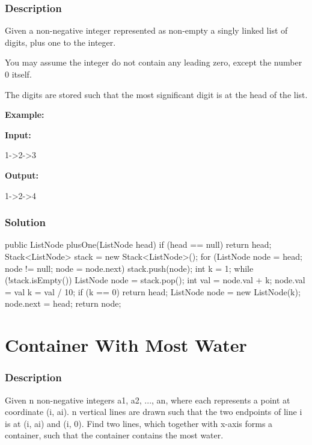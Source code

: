 \subsubsection{Description}
Given a non-negative integer represented as non-empty a singly linked list of digits, plus one to the integer.

You may assume the integer do not contain any leading zero, except the number 0 itself.

The digits are stored such that the most significant digit is at the head of the list.

\textbf{Example:}

\textbf{Input:}

1->2->3

\textbf{Output:}

1->2->4

\subsubsection{Solution}

\begin{Code}
public ListNode plusOne(ListNode head) {
    if (head == null) {
        return head;
    }
    Stack<ListNode> stack = new Stack<ListNode>();
    for (ListNode node = head; node != null; node = node.next) {
        stack.push(node);
    }
    int k = 1;
    while (!stack.isEmpty()) {
        ListNode node = stack.pop();
        int val = node.val + k;
        node.val = val %
        k = val / 10;
        if (k == 0) {
            return head;
        }
    }
    ListNode node = new ListNode(k);
    node.next = head;
    return node;
}
\end{Code}

\newpage

\section{Container With Most Water} %

\subsubsection{Description}
Given n non-negative integers a1, a2, ..., an, where each represents a point at coordinate (i, ai). n vertical lines are drawn such that the two endpoints of line i is at (i, ai) and (i, 0). Find two lines, which together with x-axis forms a container, such that the container contains the most water.

